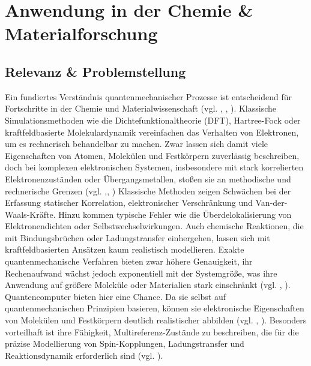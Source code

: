 \chapter{Anwendung in der Chemie \& Materialforschung}
\label{trends} %



\section{Relevanz \& Problemstellung}
{Ein fundiertes Verständnis quantenmechanischer Prozesse ist entscheidend für Fortschritte in der Chemie und Materialwissenschaft (vgl. \cite{hanaor_computational_2024}, \cite{daley_practical_2022}, \cite{bauer_quantum_2020}). Klassische Simulationsmethoden wie die Dichtefunktionaltheorie (DFT), Hartree-Fock oder kraftfeldbasierte Molekulardynamik vereinfachen das Verhalten von Elektronen, um es rechnerisch behandelbar zu machen. Zwar lassen sich damit viele Eigenschaften von Atomen, Molekülen und Festkörpern zuverlässig beschreiben, doch bei komplexen elektronischen Systemen, insbesondere mit stark korrelierten Elektronenzuständen oder Übergangsmetallen, stoßen sie an methodische und rechnerische Grenzen (vgl. \cite{daley_practical_2022},\cite{vermaStatusChallengesDensity2020}, \cite{cao_quantum_2019}) \newline\newline
Klassische Methoden zeigen Schwächen bei der Erfassung statischer Korrelation, elektronischer Verschränkung und Van-der-Waals-Kräfte. Hinzu kommen typische Fehler wie die Überdelokalisierung von Elektronendichten oder Selbstwechselwirkungen. Auch chemische Reaktionen, die mit Bindungsbrüchen oder Ladungstransfer einhergehen, lassen sich mit kraftfeldbasierten Ansätzen kaum realistisch modellieren. Exakte quantenmechanische Verfahren bieten zwar höhere Genauigkeit, ihr Rechenaufwand wächst jedoch exponentiell mit der Systemgröße, was ihre Anwendung auf größere Moleküle oder Materialien stark einschränkt (vgl. \cite{vermaStatusChallengesDensity2020}, \cite{cao_quantum_2019}).
\newline\newline
Quantencomputer bieten hier eine Chance. Da sie selbst auf quantenmechanischen Prinzipien basieren, können sie elektronische Eigenschaften von Molekülen und Festkörpern deutlich realistischer abbilden (vgl. \cite{bauer_quantum_2020}, \cite{akromDevelopmentQuantumMachine2024}). Besonders vorteilhaft ist ihre Fähigkeit, Multireferenz-Zustände zu beschreiben, die für die präzise Modellierung von Spin-Kopplungen, Ladungstransfer und Reaktionsdynamik erforderlich sind (vgl. \cite{akromDevelopmentQuantumMachine2024}).
}
